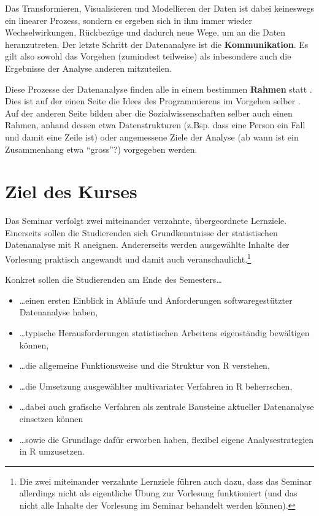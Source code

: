 \documentclass[
]{book}
\providecommand{\tightlist}{%
  \setlength{\itemsep}{0pt}\setlength{\parskip}{0pt}}
\begin{document}
Das Transformieren, Visualisieren und Modellieren der Daten ist dabei keineswegs ein linearer Prozess, sondern es ergeben sich in ihm immer wieder Wechselwirkungen, Rückbezüge und dadurch neue Wege, um an die Daten heranzutreten. Der letzte Schritt der Datenanalyse ist die \textbf{Kommunikation}. Es gilt also sowohl das Vorgehen (zumindest teilweise) als inbesondere auch die Ergebnisse der Analyse anderen mitzuteilen.

Diese Prozesse der Datenanalyse finden alle in einem bestimmen \textbf{Rahmen} statt \citep[vgl. auch][3]{Sauer2019}. Dies ist auf der einen Seite die Idees des Programmierens im Vorgehen selber \citep[vgl.][Kap.1.1]{WickhamGrolemund2016}. Auf der anderen Seite bilden aber die Sozialwissenschaften selber auch einen Rahmen, anhand dessen etwa Datenstrukturen (z.Bsp. dass eine Person ein Fall und damit eine Zeile ist) oder angemessene Ziele der Analyse (ab wann ist ein Zusammenhang etwa ``gross''?) vorgegeben werden.

\hypertarget{ziel-des-kurses}{%
\section{Ziel des Kurses}\label{ziel-des-kurses}}

Das Seminar verfolgt zwei miteinander verzahnte, übergeordnete Lernziele. Einerseits sollen die Studierenden sich Grundkenntnisse der statistischen Datenanalyse mit R aneignen. Andererseits werden ausgewählte Inhalte der Vorlesung praktisch angewandt und damit auch veranschaulicht.\footnote{Die zwei miteinander verzahnte Lernziele führen auch dazu, dass das Seminar allerdings nicht als eigentliche Übung zur Vorlesung funktioniert (und das nicht alle Inhalte der Vorlesung im Seminar behandelt werden können).}

Konkret sollen die Studierenden am Ende des Semesters\ldots{}

\begin{itemize}
\tightlist
\item
  \ldots einen ersten Einblick in Abläufe und Anforderungen softwaregestützter Datenanalyse haben,
\item
  \ldots typische Herausforderungen statistischen Arbeitens eigenständig bewältigen können,
\item
  \ldots die allgemeine Funktionsweise und die Struktur von R verstehen,
\item
  \ldots die Umsetzung ausgewählter multivariater Verfahren in R beherrschen,
\item
  \ldots dabei auch grafische Verfahren als zentrale Bausteine aktueller Datenanalyse einsetzen können
\item
  \ldots sowie die Grundlage dafür erworben haben, flexibel eigene Analysestrategien in R umzusetzen.
\end{itemize}
\end{document}
